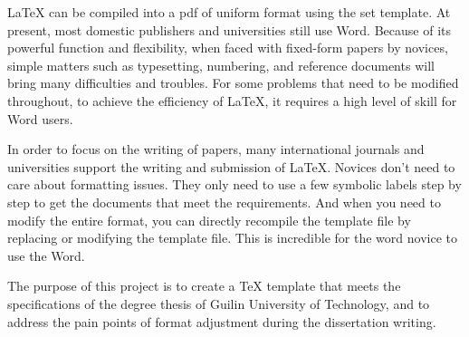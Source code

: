 \begin{abstracten}
LaTeX can be compiled into a pdf of uniform format using the set template. At present, most domestic publishers and universities still use Word. Because of its powerful function and flexibility, when faced with fixed-form papers by novices, simple matters such as typesetting, numbering, and reference documents will bring many difficulties and troubles. For some problems that need to be modified throughout, to achieve the efficiency of LaTeX, it requires a high level of skill for Word users.

In order to focus on the writing of papers, many international journals and universities support the writing and submission of LaTeX. Novices don't need to care about formatting issues. They only need to use a few symbolic labels step by step to get the documents that meet the requirements. And when you need to modify the entire format, you can directly recompile the template file by replacing or modifying the template file. This is incredible for the word novice to use the Word.

The purpose of this project is to create a TeX template that meets the specifications of the degree thesis of Guilin University of Technology, and to address the pain points of format adjustment during the dissertation writing.
\end{abstracten}